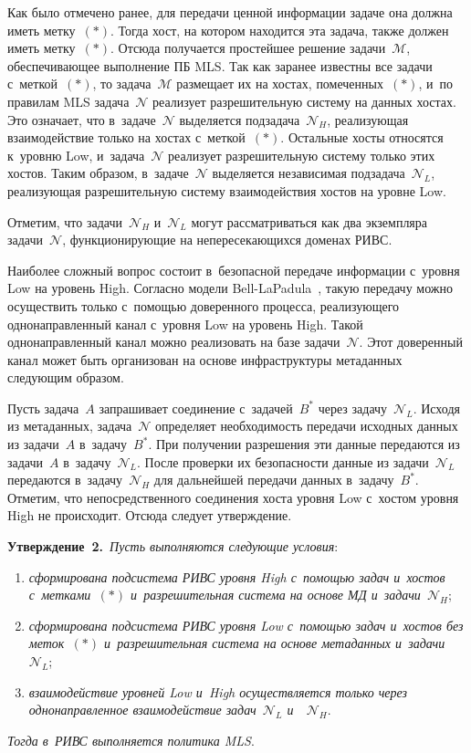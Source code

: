 \begin{multicols}{2}
  Как было отмечено ранее, для передачи ценной информации задаче она должна 
иметь метку~$(*)$. Тогда хост, на котором находится эта задача, также должен 
иметь метку~$(*)$. Отсюда получается простейшее решение 
задачи~$\mathcal{M}$, обеспечивающее выполнение ПБ
MLS. Так как заранее известны все задачи с~меткой~$(*)$, то 
задача~$\mathcal{M}$ размещает их на хостах, помеченных~$(*)$, и~по правилам 
MLS задача~$\mathcal{N}$ реализует разрешительную систему на данных хостах. 
Это означает, что в~задаче~$\mathcal{N}$ выделяется подзадача~$\mathcal{N}_H$, 
реа\-ли\-зу\-ющая взаимодействие только на хостах с~меткой~$(*)$. Остальные хосты 
относятся к~уровню Low, и~задача~$\mathcal{N}$ реализует разрешительную 
систему только этих хостов. Таким образом, в~задаче~$\mathcal{N}$ выделяется 
независимая подзадача~$\mathcal{N}_L$, реализующая разрешительную систему 
взаимодействия хостов на уровне Low. 
  
  Отметим, что задачи~$\mathcal{N}_H$ и~$\mathcal{N}_L$ могут 
рассматриваться как два экземпляра задачи~$\mathcal{N}$, функционирующие на 
непересекающихся доменах РИВС. 
  
  Наиболее сложный вопрос состоит в~безопасной передаче информации с~уровня 
Low на уровень High. Согласно модели Bell-LaPadula~\cite{9-tt}, такую передачу 
можно осуществить только с~по\-мощью доверенного процесса, реализующего 
од\-но\-на\-прав\-лен\-ный канал с~уровня Low на уровень High. Такой однонаправленный 
канал можно реализовать на базе задачи~$\mathcal{N}$. Этот доверенный канал 
может быть организован на основе инфраструктуры метаданных следующим 
образом. 
  
  Пусть задача~$A$ запрашивает соединение с~задачей~$B^*$ через 
задачу~$\mathcal{N}_L$. Исходя из метаданных, задача~$\mathcal{N}$ 
определяет необходимость передачи исходных данных из задачи~$A$ 
в~задачу~$B^*$. При получении разрешения эти данные передаются из задачи~$A$ в~задачу~$\mathcal{N}_L$. После проверки их безопасности данные из 
задачи~$\mathcal{N}_L$ передаются в~задачу~$\mathcal{N}_H$ для дальнейшей 
передачи данных в~задачу~$B^*$. Отметим, что непосредственного соединения 
хоста уровня Low с~хостом уровня High не происходит. Отсюда следует 
утверждение. 
  
  \smallskip
  
  \noindent
  \textbf{Утверждение~2.}\ \textit{Пусть выполняются следующие условия}:
  \begin{enumerate}[(1)]
  \item \textit{ сформирована подсистема РИВС уровня High с~помощью задач 
  и~хостов с~метками~$(*)$ и~разрешительная система на основе МД 
и~задачи}~$\mathcal{N}_H$;
\item \textit{сформирована подсистема РИВС уровня Low с~помощью задач 
и~хостов без меток~$(*)$ и~разрешительная система на основе метаданных 
и~задачи}~$\mathcal{N}_L$;
  \item \textit{взаимодействие уровней Low и~High осуществляется только через 
однонаправленное взаимодействие задач~$\mathcal{N}_L$ 
и~~$\mathcal{N}_H$}. 
  \end{enumerate}
  \textit{Тогда в~РИВС выполняется политика MLS}.
  

\end{multicols}
